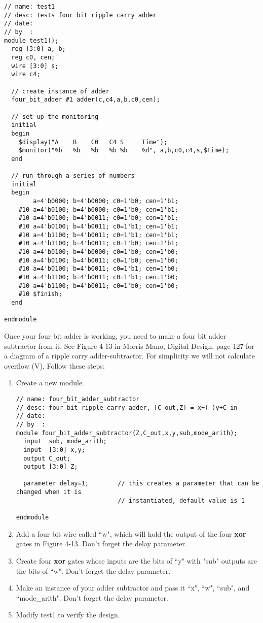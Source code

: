 \begin{verbatim}
// name: test1
// desc: tests four bit ripple carry adder
// date:
// by  :
module test1();
  reg [3:0] a, b;
  reg c0, cen;
  wire [3:0] s;
  wire c4;

  // create instance of adder
  four_bit_adder #1 adder(c,c4,a,b,c0,cen);

  // set up the monitoring
  initial
  begin
    $display("A    B    C0   C4 S     Time");
    $monitor("%b   %b   %b   %b %b    %d", a,b,c0,c4,s,$time);
  end

  // run through a series of numbers
  initial
  begin
        a=4'b0000; b=4'b0000; c0=1'b0; cen=1'b1;
    #10 a=4'b0100; b=4'b0000; c0=1'b0; cen=1'b1;
    #10 a=4'b0100; b=4'b0011; c0=1'b0; cen=1'b1;
    #10 a=4'b0100; b=4'b0011; c0=1'b1; cen=1'b1;
    #10 a=4'b1100; b=4'b0011; c0=1'b1; cen=1'b1;
    #10 a=4'b1100; b=4'b0011; c0=1'b0; cen=1'b1;
    #10 a=4'b0100; b=4'b0000; c0=1'b0; cen=1'b0;
    #10 a=4'b0100; b=4'b0011; c0=1'b0; cen=1'b0;
    #10 a=4'b0100; b=4'b0011; c0=1'b1; cen=1'b0;
    #10 a=4'b1100; b=4'b0011; c0=1'b1; cen=1'b0;
    #10 a=4'b1100; b=4'b0011; c0=1'b0; cen=1'b0;
    #10 $finish;
  end

endmodule
\end{verbatim}

Once your four bit adder is working, you need to make a four bit adder subtractor from it.  See Figure 4-13 in Morris Mano, Digital Design, page 127 for a diagram of a ripple carry adder-subtractor.  For simplicity we will not calculate overflow (V).   Follow these steps:

\begin{enumerate}
\item Create a new module.

\begin{verbatim}
// name: four_bit_adder_subtractor
// desc: four bit ripple carry adder, [C_out,Z] = x+(-)y+C_in
// date:
// by  :
module four_bit_adder_subtractor(Z,C_out,x,y,sub,mode_arith);
  input  sub, mode_arith;
  input  [3:0] x,y;
  output C_out;
  output [3:0] Z;

  parameter delay=1;        // this creates a parameter that can be changed when it is
                            // instantiated, default value is 1

endmodule
\end{verbatim}

\item Add a four bit wire called ``w", which will hold the output of the four \textbf{xor} gates in Figure 4-13.  Don't forget the delay parameter.

\item Create four \textbf{xor} gates whose inputs are the bits of ``y" with "sub" outputs are the bits of ``w".  Don't forget the delay parameter.

\item Make an instance of your adder subtractor and pass it ``x", ``w", ``sub", and ``mode\_arith".  Don't forget the delay parameter.

\item Modify test1 to verify the design.
\end{enumerate}

